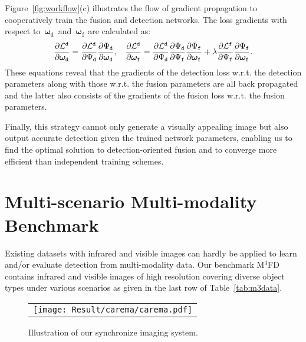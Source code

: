 \documentclass[10pt,twocolumn,letterpaper]{article}
\begin{document}
Figure~\ref{fig:workflow}(c) illustrates the flow of gradient propagation to cooperatively train the fusion and detection networks. The loss gradients with respect to~$\bm{\omega}_\mathtt{d}$~and~$\bm{\omega}_\mathtt{f}$ are calculated as:
\begin{equation}
\small
\frac{\partial\mathcal{L}^{\mathtt{d}}}{\partial\bm{\omega}_\mathtt{d}}=\frac{\partial\mathcal{L}^\mathtt{d}}{\partial\Psi_\mathtt{d}}\frac{\partial\Psi_\mathtt{d}}{\partial\bm{\omega}_\mathtt{d}}, \quad \frac{\partial\mathcal{L}^{\mathtt{d}}}{\partial\bm{\omega}_\mathtt{f}}=\frac{\partial\mathcal{L}^\mathtt{d}}{\partial\Psi_\mathtt{d}}\frac{\partial\Psi_\mathtt{d}}{\partial\Psi_\mathtt{f}}\frac{\partial\Psi_\mathtt{f}}{\partial\bm{\omega}_\mathtt{f}}+\lambda\frac{\partial\mathcal{L}^\mathtt{f}}{\partial\Psi_\mathtt{f}}\frac{\partial\Psi_\mathtt{f}}{\partial\bm{\omega}_\mathtt{f}}.
\small
\end{equation}
These equations reveal that the gradients of the detection loss w.r.t. the detection parameters along with those w.r.t. the fusion parameters are all back propagated and the latter also consists of the gradients of the fusion loss w.r.t. the fusion parameters.

Finally, this strategy cannot only generate a visually appealing image but also output accurate detection given the trained network parameters, enabling us to find the optimal solution to detection-oriented fusion and to converge more efficient than independent training schemes.

\section{Multi-scenario Multi-modality Benchmark}
Existing datasets with infrared and visible images can hardly be applied to learn and/or evaluate detection from multi-modality data. Our benchmark M$^3$FD contains infrared and visible images of high resolution covering diverse object types under various scenarios as given in the last row of Table~\ref{tab:m3data}.
\begin{figure}[!htb]
	\centering
	\setlength{\tabcolsep}{1pt}
	\begin{tabular}{c}
		
		\texttt{[image: Result/carema/carema.pdf]}
		\\ 				
	\end{tabular}
	\vspace{-0.2cm}
	\caption{Illustration of our synchronize imaging system.}
	\label{fig:SYSTEM}
\end{figure}
\end{document}

